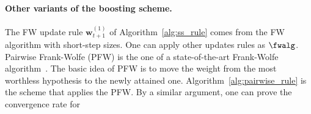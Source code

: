\paragraph{Other variants of the boosting scheme.}
%
%
\begin{algorithm}[th]
    \begin{algorithmic}[1]



    \end{algorithmic}
    \caption{%
        Pairwise rule %
        $
            \fwalg
            (
                A, \bm{w}_t, \bm{e}_{j_{t+1}},
                \eset_{t}, \bm{d}_t
            )
        $
    }
    \label{alg:pairwise_rule}
\end{algorithm}
The FW update rule $\bm{w}_{t+1}^{(1)}$ 
of Algorithm~\ref{alg:ss_rule} 
comes from the FW algorithm with short-step sizes. 
One can apply other updates rules as $\fwalg$. 
Pairwise Frank-Wolfe (PFW) is 
the one of a state-of-the-art Frank-Wolfe 
algorithm~\citep{lacoste-julien+:nips15}. 
The basic idea of PFW is to move the weight from 
the most worthless hypothesis to the newly attained one. 
Algorithm~\ref{alg:pairwise_rule} is the scheme 
that applies the PFW. 
By a similar argument, one can prove the convergence rate for 
